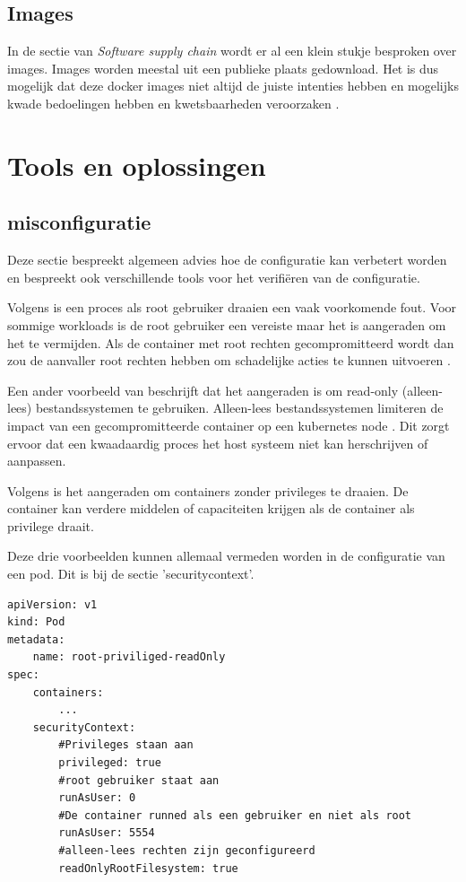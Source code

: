 \subsection{Images}
In de sectie van \textit{Software supply chain} wordt er al een klein stukje besproken over images. Images worden meestal uit een publieke plaats gedownload. Het is dus mogelijk dat deze docker images niet altijd de juiste intenties hebben en mogelijks kwade bedoelingen hebben en kwetsbaarheden veroorzaken \autocite{mytilinakis2020attack}. 



\section{Tools en oplossingen}

\subsection{misconfiguratie}
Deze sectie bespreekt algemeen advies hoe de configuratie kan verbetert worden en bespreekt ook verschillende tools voor het verifiëren van de configuratie.

Volgens \textcite{OWASP-2023} is een proces als root gebruiker draaien een vaak voorkomende fout. Voor sommige workloads is de root gebruiker een vereiste maar het is aangeraden om het te vermijden. Als de container met root rechten gecompromitteerd wordt dan zou de aanvaller root rechten hebben om schadelijke acties te kunnen uitvoeren \autocite{OWASP-2023}.  

Een ander voorbeeld van \textcite{OWASP-2023} beschrijft dat het aangeraden is om read-only (alleen-lees) bestandssystemen te gebruiken. Alleen-lees bestandssystemen limiteren de impact van een gecompromitteerde container op een kubernetes node \autocite{OWASP-2023}. Dit zorgt ervoor dat een kwaadaardig proces het host systeem niet kan herschrijven of aanpassen.

Volgens \textcite{OWASP-2023} is het aangeraden om containers zonder privileges te draaien. De container kan verdere middelen of capaciteiten krijgen als de container als privilege draait. 

Deze drie voorbeelden kunnen allemaal vermeden worden in de configuratie van een pod. Dit is bij de sectie 'securitycontext'. 
\begin{verbatim}
apiVersion: v1  
kind: Pod  
metadata:  
    name: root-priviliged-readOnly
spec:  
    containers:  
        ...
    securityContext:  
        #Privileges staan aan 
        privileged: true
        #root gebruiker staat aan
        runAsUser: 0
        #De container runned als een gebruiker en niet als root
        runAsUser: 5554
        #alleen-lees rechten zijn geconfigureerd
        readOnlyRootFilesystem: true
\end{verbatim}

